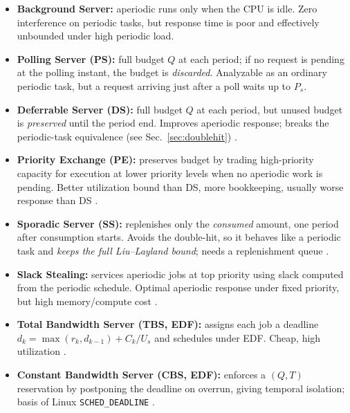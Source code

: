 \documentclass[conference]{IEEEtran}
\begin{document}
\begin{itemize}
  \item \textbf{Background Server:} aperiodic runs only when the CPU is idle.
        Zero interference on periodic tasks, but response time is poor and
        effectively unbounded under high periodic load.
  \item \textbf{Polling Server (PS):} full budget $Q$ at each period; if no
        request is pending at the polling instant, the budget is
        \emph{discarded}. Analyzable as an ordinary periodic task, but a
        request arriving just after a poll waits up to $P_s$.
  \item \textbf{Deferrable Server (DS):} full budget $Q$ at each period, but
        unused budget is \emph{preserved} until the period end. Improves
        aperiodic response; breaks the periodic-task equivalence (see
        Sec.~\ref{sec:doublehit}) \cite{lehoczky1987enhanced,strosnider1995deferrable}.
  \item \textbf{Priority Exchange (PE):} preserves budget by trading
        high-priority capacity for execution at lower priority levels when no
        aperiodic work is pending. Better utilization bound than DS, more
        bookkeeping, usually worse response than DS \cite{lehoczky1987enhanced}.
  \item \textbf{Sporadic Server (SS):} replenishes only the \emph{consumed}
        amount, one period after consumption starts. Avoids the double-hit, so
        it behaves like a periodic task and \emph{keeps the full
        Liu--Layland bound}; needs a replenishment queue
        \cite{sprunt1989aperiodic}.
  \item \textbf{Slack Stealing:} services aperiodic jobs at top priority using
        slack computed from the periodic schedule. Optimal aperiodic response
        under fixed priority, but high memory/compute cost
        \cite{lehoczky1992slack}.
  \item \textbf{Total Bandwidth Server (TBS, EDF):} assigns each job a deadline
        $d_k=\max(r_k,d_{k-1})+C_k/U_s$ and schedules under EDF. Cheap, high
        utilization \cite{spuri1996scheduling}.
  \item \textbf{Constant Bandwidth Server (CBS, EDF):} enforces a $(Q,T)$
        reservation by postponing the deadline on overrun, giving temporal
        isolation; basis of Linux \texttt{SCHED\_DEADLINE}
        \cite{abeni1998integrating}.
\end{itemize}
\end{document}
